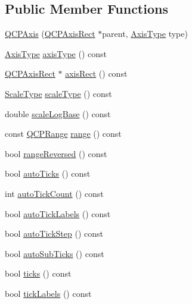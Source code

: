 \subsection*{Public Member Functions}
\begin{DoxyCompactItemize}
\item 
\hyperlink{class_q_c_p_axis_ac62c042968bae0e6d474fcfc57c9b71f}{Q\-C\-P\-Axis} (\hyperlink{class_q_c_p_axis_rect}{Q\-C\-P\-Axis\-Rect} $\ast$parent, \hyperlink{class_q_c_p_axis_ae2bcc1728b382f10f064612b368bc18a}{Axis\-Type} type)
\item 
\hyperlink{class_q_c_p_axis_ae2bcc1728b382f10f064612b368bc18a}{Axis\-Type} \hyperlink{class_q_c_p_axis_a593c37bf6aa4990326dc09e24f45db7f}{axis\-Type} () const 
\item 
\hyperlink{class_q_c_p_axis_rect}{Q\-C\-P\-Axis\-Rect} $\ast$ \hyperlink{class_q_c_p_axis_aada3102af43b029e3879bcbf2bddfabb}{axis\-Rect} () const 
\item 
\hyperlink{class_q_c_p_axis_a36d8e8658dbaa179bf2aeb973db2d6f0}{Scale\-Type} \hyperlink{class_q_c_p_axis_a8563e13407bc0616da7f7c84e02de170}{scale\-Type} () const 
\item 
double \hyperlink{class_q_c_p_axis_ac937d2a602f865aff2ab6c1e288739f6}{scale\-Log\-Base} () const 
\item 
const \hyperlink{class_q_c_p_range}{Q\-C\-P\-Range} \hyperlink{class_q_c_p_axis_ab1ea79a4f5ea4cf42620f8f51c477ac4}{range} () const 
\item 
bool \hyperlink{class_q_c_p_axis_ade26dc7994ccd8a11f64fd83377ee021}{range\-Reversed} () const 
\item 
bool \hyperlink{class_q_c_p_axis_afc7f20e30dc2865ff6c39f3281f330c2}{auto\-Ticks} () const 
\item 
int \hyperlink{class_q_c_p_axis_ac87454a1342f5d2939ab59e68b4d515b}{auto\-Tick\-Count} () const 
\item 
bool \hyperlink{class_q_c_p_axis_a7169da316ac25dec1606784152fbf2c1}{auto\-Tick\-Labels} () const 
\item 
bool \hyperlink{class_q_c_p_axis_ae762920261b0c24beb56b893e5a2471d}{auto\-Tick\-Step} () const 
\item 
bool \hyperlink{class_q_c_p_axis_ab9a950e16f373fe5c4b79078bb97c171}{auto\-Sub\-Ticks} () const 
\item 
bool \hyperlink{class_q_c_p_axis_a61c504ec7c5bed9a63edf45345995d10}{ticks} () const 
\item 
bool \hyperlink{class_q_c_p_axis_a9a78fcccd98a73d37b3d991df7b6ef1d}{tick\-Labels} () const 

\end{DoxyCompactItemize}
